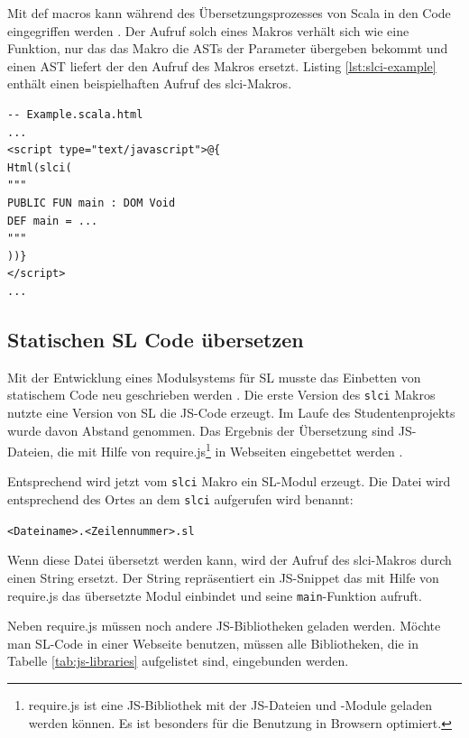 \documentclass[12pt,bibtotoc]{scrreprt}
\begin{document}
Mit def macros kann während des Übersetzungsprozesses von Scala in den Code eingegriffen werden \cite{EPFL2}. Der Aufruf solch eines Makros verhält sich wie eine Funktion, nur das das Makro die \ac{AST}s der Parameter übergeben bekommt und einen \ac{AST} liefert der den Aufruf des Makros ersetzt. Listing \ref{lst:slci-example} enthält einen beispielhaften Aufruf des slci-Makros.

\begin{lstlisting}[caption={Beispielaufruf des slci-Makros in einer Play View}, label=lst:slci-example, float=h]
-- Example.scala.html
...
<script type="text/javascript">@{
Html(slci(
"""
PUBLIC FUN main : DOM Void
DEF main = ...
"""
))}
</script>
...
\end{lstlisting}

\subsection{Statischen SL Code übersetzen}
\label{subsec:compile-static-sl}

Mit der Entwicklung eines Modulsystems für \ac{SL} musste das Einbetten von statischem Code neu geschrieben werden \cite{Bisping2013}. Die erste Version des \lstinline!slci! Makros nutzte eine Version von \ac{SL} die \ac{JS}-Code erzeugt. Im Laufe des Studentenprojekts wurde davon Abstand genommen. Das Ergebnis der Übersetzung sind \ac{JS}-Dateien, die mit Hilfe von require.js\footnote{require.js ist eine JS-Bibliothek mit der JS-Dateien und -Module geladen werden können. Es ist besonders für die Benutzung in Browsern optimiert.} in Webseiten eingebettet werden \cite{RequireJS1}.

Entsprechend wird jetzt vom \lstinline!slci! Makro ein \ac{SL}-Modul erzeugt. Die Datei wird entsprechend des Ortes an dem \lstinline!slci! aufgerufen wird benannt:
\begin{center}
\lstinline!<Dateiname>.<Zeilennummer>.sl!
\end{center}
Wenn diese Datei übersetzt werden kann, wird der Aufruf des slci-Makros durch einen String ersetzt. Der String repräsentiert ein JS-Snippet das mit Hilfe von require.js das übersetzte Modul einbindet und seine \lstinline!main!-Funktion aufruft.

Neben require.js müssen noch andere \ac{JS}-Bibliotheken geladen werden. Möchte man \ac{SL}-Code in einer Webseite benutzen, müssen alle Bibliotheken, die in Tabelle \ref{tab:js-libraries} aufgelistet sind, eingebunden werden.
\end{document}

